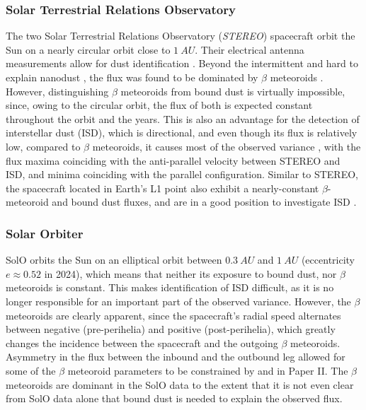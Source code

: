 \subsubsection{Solar Terrestrial Relations Observatory}

The two Solar Terrestrial Relations Observatory (\textit{STEREO}) spacecraft orbit the Sun on a nearly circular orbit close to $\SI{1}{AU}$. Their electrical antenna measurements allow for dust identification \citep{meyer2009dust}. Beyond the intermittent and hard to explain nanodust \citep{meyer2009dust}, the flux was found to be dominated by $\beta$ meteoroids \citep{zaslavsky2012interplanetary}. However, distinguishing $\beta$ meteoroids from bound dust is virtually impossible, since, owing to the circular orbit, the flux of both is expected constant throughout the orbit and the years. This is also an advantage for the detection of interstellar dust (ISD), which is directional, and even though its flux is relatively low, compared to $\beta$ meteoroids, it causes most of the observed variance \citep{zaslavsky2012interplanetary,malaspina2015revisiting,babic2022situ}, with the flux maxima coinciding with the anti-parallel velocity between STEREO and ISD, and minima coinciding with the parallel configuration. Similar to STEREO, the spacecraft located in Earth's L1 point also exhibit a nearly-constant $\beta$-meteoroid and bound dust fluxes, and are in a good position to investigate ISD \citep{malaspina2014interplanetary,malaspina2016database}.

\subsubsection{Solar Orbiter}

SolO orbits the Sun on an elliptical orbit between $\SI{0.3}{AU}$ and $\SI{1}{AU}$ (eccentricity $e \approx 0.52$ in 2024), which means that neither its exposure to bound dust, nor $\beta$ meteoroids is constant. This makes identification of ISD difficult, as it is no longer responsible for an important part of the observed variance. However, the $\beta$ meteoroids are clearly apparent, since the spacecraft's radial speed alternates between negative (pre-perihelia) and positive (post-perihelia), which greatly changes the incidence between the spacecraft and the outgoing $\beta$ meteoroids. Asymmetry in the flux between the inbound and the outbound leg allowed for some of the $\beta$ meteoroid parameters to be constrained by \citet{zaslavsky2021first} and in Paper II. The $\beta$ meteoroids are dominant in the SolO data to the extent that it is not even clear from SolO data alone that bound dust is needed to explain the observed flux.

